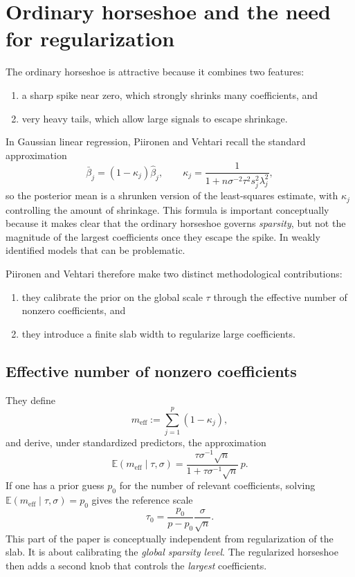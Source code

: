 \documentclass[11pt]{article}
\newcommand{\E}{\mathbb{E}}
\begin{document}
\section{Ordinary horseshoe and the need for regularization}

The ordinary horseshoe is attractive because it combines two features:
\begin{enumerate}
\item a sharp spike near zero, which strongly shrinks many coefficients, and
\item very heavy tails, which allow large signals to escape shrinkage.
\end{enumerate}
In Gaussian linear regression, Piironen and Vehtari recall the standard approximation
\begin{equation}
\bar{\beta}_j = (1-\kappa_j)\hat{\beta}_j,
\qquad
\kappa_j = \frac{1}{1+n\sigma^{-2}\tau^2 s_j^2\lambda_j^2},
\label{eq:shrinkage-factor}
\end{equation}
so the posterior mean is a shrunken version of the least-squares estimate, with $\kappa_j$ controlling the amount of shrinkage. This formula is important conceptually because it makes clear that the ordinary horseshoe governs \emph{sparsity}, but not the magnitude of the largest coefficients once they escape the spike. In weakly identified models that can be problematic.

Piironen and Vehtari therefore make two distinct methodological contributions:
\begin{enumerate}
\item they calibrate the prior on the global scale $\tau$ through the effective number of nonzero coefficients, and
\item they introduce a finite slab width to regularize large coefficients.
\end{enumerate}

\subsection{Effective number of nonzero coefficients}

They define
\begin{equation}
m_{\mathrm{eff}} := \sum_{j=1}^p (1-\kappa_j),
\label{eq:meff}
\end{equation}
and derive, under standardized predictors, the approximation
\begin{equation}
\E(m_{\mathrm{eff}} \mid \tau,\sigma)
=
\frac{\tau \sigma^{-1}\sqrt{n}}{1+\tau \sigma^{-1}\sqrt{n}}\,p.
\label{eq:meff-mean}
\end{equation}
If one has a prior guess $p_0$ for the number of relevant coefficients, solving $\E(m_{\mathrm{eff}} \mid \tau,\sigma)=p_0$ gives the reference scale
\begin{equation}
\tau_0 = \frac{p_0}{p-p_0}\frac{\sigma}{\sqrt{n}}.
\label{eq:tau0}
\end{equation}
This part of the paper is conceptually independent from regularization of the slab. It is about calibrating the \emph{global sparsity level}. The regularized horseshoe then adds a second knob that controls the \emph{largest} coefficients.
\end{document}
